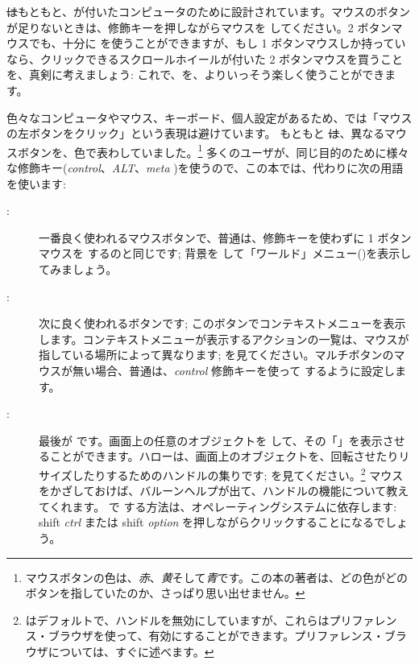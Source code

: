 \documentclass[a4paper,10pt,twoside]{book}
\begin{document}
\st はもともと、が付いたコンピュータのために設計されています。マウスのボタンが足りないときは、修飾キーを押しながらマウスを \click してください。2 ボタンマウスでも、十分に \pharo を使うことができますが、もし 1 ボタンマウスしか持っていなら、クリックできるスクロールホイールが付いた 2 ボタンマウスを買うことを、真剣に考えましょう: これで、\pharo を、よりいっそう楽しく使うことができます。

色々なコンピュータやマウス、キーボード、個人設定があるため、\pharo では「マウスの左ボタンをクリック」という表現は避けています。
もともと \st は、異なるマウスボタンを、色で表わしていました。\footnote{マウスボタンの色は、\emph{赤}、\emph{黄}そして\emph{青}です。この本の著者は、どの色がどのボタンを指していたのか、さっぱり思い出せません。}
多くのユーザが、同じ目的のために様々な修飾キー(\emph{control}、\emph{ALT}、\emph{meta} \etc)を使うので、この本では、代わりに次の用語を使います:
\begin{description}
\item [\click:] 一番良く使われるマウスボタンで、普通は、修飾キーを使わずに 1 ボタンマウスを \click するのと同じです; 背景を \click して「ワールド」メニュー()を表示してみましょう。
\item [\actclick:] 次に良く使われるボタンです; このボタンでコンテキストメニューを表示します。コンテキストメニューが表示するアクションの一覧は、マウスが指している場所によって異なります; を見てください。マルチボタンのマウスが無い場合、普通は、\emph{control} 修飾キーを使って \actclick するように設定します。
\item [\metaclick:] 最後が \metaclick です。画面上の任意のオブジェクトを \metaclick して、その「」を表示させることができます。ハローは、画面上のオブジェクトを、回転させたりリサイズしたりするためのハンドルの集りです;  を見てください。\footnote{\pharo はデフォルトで、ハンドルを無効にしていますが、これらはプリファレンス・ブラウザを使って、有効にすることができます。プリファレンス・ブラウザについては、すぐに述べます。}
マウスをかざしておけば、バルーンヘルプが出て、ハンドルの機能について教えてくれます。
\pharo で \metaclick する方法は、オペレーティングシステムに依存します:
{\sc shift} \emph{ctrl} または {\sc shift} \emph{option} を押しながらクリックすることになるでしょう。
\end{description}
\end{document}
